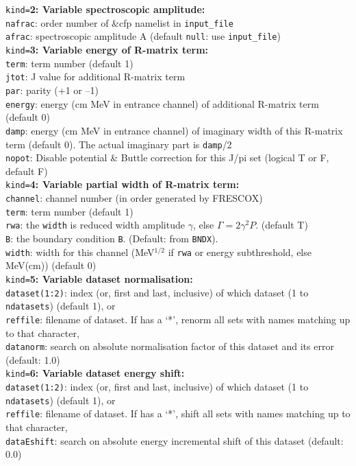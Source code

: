 \documentclass[11pt]{article}
\begin{document}
{\tt kind=}{\bf 2: Variable spectroscopic amplitude:}\\
{\tt nafrac}: order number of \&cfp namelist in {\tt input\_file}\\
{\tt afrac}: spectroscopic amplitude A (default {\tt null}: use {\tt input\_file})\\

{\tt kind=}{\bf 3: Variable energy of R-matrix term:}\\
{\tt term}: term number (default 1)\\
{\tt jtot}: J value for additional R-matrix term\\
{\tt par}: parity (+1 or --1)\\
{\tt energy}: energy (cm MeV in entrance channel) of additional R-matrix term (default 0)\\
{\tt damp}: energy (cm MeV in entrance channel) of imaginary width of this R-matrix term (default 0). The actual  imaginary part is {\tt damp}/2\\
{\tt nopot}: Disable potential \& Buttle correction for this J/pi set (logical T or F, default F)\\

{\tt kind=}{\bf 4: Variable partial width of R-matrix term:}\\
{\tt channel}: channel number (in order generated by FRESCOX)\\
{\tt term}: term number (default 1)\\
{\tt rwa}: the {\tt width} is reduced width amplitude $\gamma$, else $\Gamma=2\gamma^2 P$.  (default T)\\
{\tt B}: the boundary condition {\tt B}. (Default: from {\tt BNDX}).\\
{\tt width}: width for this channel (MeV$^{1/2}$ if {\tt rwa} or energy subthreshold, else MeV(cm)) (default 0)\\


{\tt kind=}{\bf 5: Variable dataset normalisation:}\\
{\tt dataset(1:2)}: index (or, first and last, inclusive) of which dataset (1 to {\tt ndatasets}) (default 1), or\\
{\tt reffile}: filename of dataset. If has a `*', renorm all sets with names matching up to that character,\\ 
{\tt datanorm}: search on absolute normalisation factor of this dataset and its error (default: 1.0)\\


{\tt kind=}{\bf 6: Variable dataset energy shift:}\\
{\tt dataset(1:2)}: index (or, first and last, inclusive) of which dataset (1 to {\tt ndatasets}) (default 1), or\\
{\tt reffile}: filename of dataset. If has a  `*', shift all sets with names matching  up to that character,\\ 
{\tt dataEshift}: search on absolute energy incremental shift of this dataset  (default: 0.0)\\
\end{document}
